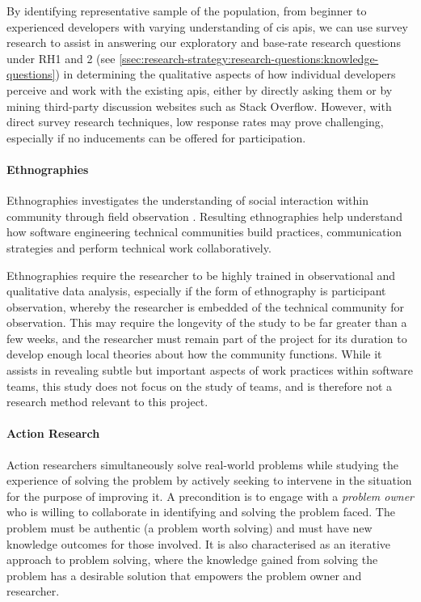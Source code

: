 By identifying representative sample of the population, from beginner to experienced developers with varying understanding of \gls{cis} \glspl{api}, we can use survey research to assist in answering our exploratory and base-rate research questions under RH1 and 2 (see \cref{ssec:research-strategy:research-questions:knowledge-questions}) in determining the qualitative aspects of how individual developers perceive and work with the existing \glspl{api}, either by directly asking them or by mining third-party discussion websites such as Stack Overflow. However, with direct survey research techniques, low response rates may prove challenging, especially if no inducements can be offered for participation.

\paragraph{Ethnographies}
Ethnographies investigates the understanding of social interaction within community through field observation . Resulting ethnographies help understand how software engineering technical communities build practices, communication strategies and perform technical work collaboratively. 

Ethnographies require the researcher to be highly trained in observational and qualitative data analysis, especially if the form of ethnography is participant observation, whereby the researcher is embedded of the technical community for observation. This may require the longevity of the study to be far greater than a few weeks, and the researcher must remain part of the project for its duration to develop enough local theories about how the community functions. While it assists in revealing subtle but important aspects of work practices within software teams, this study does not focus on the study of teams, and is therefore not a research method relevant to this project.


\paragraph{Action Research}
Action researchers simultaneously solve real-world problems while studying the experience of solving the problem  by actively seeking to intervene in the situation for the purpose of improving it. A precondition is to engage with a \textit{problem owner} who is willing to collaborate in identifying and solving the problem faced. The problem must be authentic (a problem worth solving) and must have new knowledge outcomes for those involved. It is also characterised as an iterative approach to problem solving, where the knowledge gained from solving the problem has a desirable solution that empowers the problem owner and researcher. 

